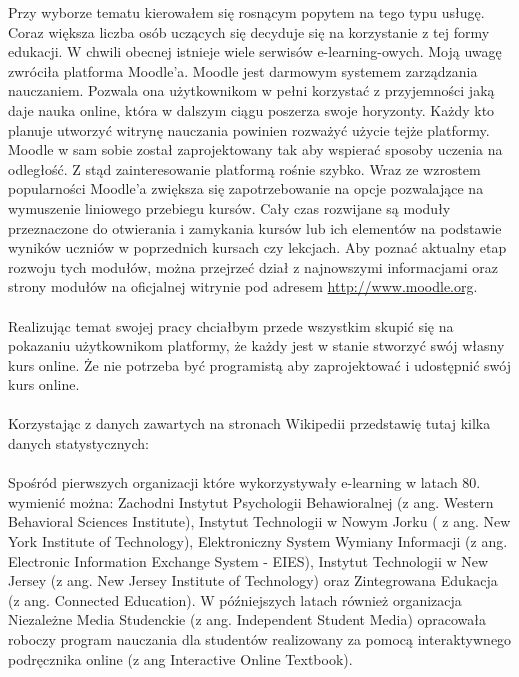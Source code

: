 \hspace{1cm} Przy wyborze tematu kierowałem się rosnącym popytem na tego typu usługę. Coraz większa liczba osób uczących się decyduje się na korzystanie z tej formy edukacji. W chwili obecnej istnieje wiele serwisów e-learning-owych. Moją uwagę zwróciła platforma Moodle'a. Moodle jest darmowym systemem zarządzania nauczaniem. Pozwala ona użytkownikom w pełni korzystać z przyjemności jaką daje nauka online, która w dalszym ciągu poszerza swoje horyzonty. Każdy kto planuje utworzyć witrynę nauczania powinien rozważyć użycie tejże platformy. Moodle w sam sobie został zaprojektowany tak aby wspierać sposoby uczenia na odległość. Z stąd zainteresowanie platformą rośnie szybko. Wraz ze wzrostem popularności Moodle'a zwiększa się zapotrzebowanie na opcje pozwalające na wymuszenie liniowego przebiegu kursów. Cały czas rozwijane są moduły przeznaczone do otwierania i zamykania kursów lub ich elementów na podstawie wyników uczniów w poprzednich kursach czy lekcjach. Aby poznać aktualny etap rozwoju tych modułów, można przejrzeć dział z najnowszymi informacjami oraz strony modułów na oficjalnej witrynie pod adresem \href{http://www.moodle.org}{http://www.moodle.org}. \\
\ \\
Realizując temat swojej pracy chciałbym przede wszystkim skupić się na pokazaniu użytkownikom platformy, że każdy jest w stanie stworzyć swój własny kurs online. Że nie potrzeba być programistą aby zaprojektować i udostępnić swój kurs online. \\
\ \\
Korzystając z danych zawartych na stronach Wikipedii przedstawię tutaj kilka danych statystycznych: \\
\ \\
Spośród pierwszych organizacji które wykorzystywały e-learning w latach 80. wymienić można: Zachodni Instytut Psychologii Behawioralnej (z ang. Western Behavioral Sciences Institute), Instytut Technologii w Nowym Jorku ( z ang. New York Institute of Technology), Elektroniczny System Wymiany Informacji (z ang. Electronic Information Exchange System - EIES), Instytut Technologii w New Jersey (z ang. New Jersey Institute of Technology) oraz Zintegrowana Edukacja (z ang. Connected Education). W późniejszych latach również organizacja Niezależne Media Studenckie (z ang. Independent Student Media) opracowała roboczy program nauczania dla studentów realizowany za pomocą interaktywnego podręcznika online (z ang Interactive Online Textbook). \\
